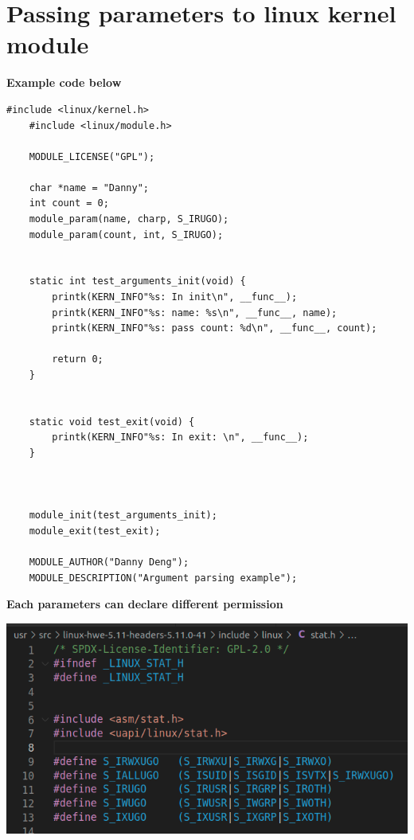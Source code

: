 \section{Passing parameters to linux kernel module}


\textbf{Example code below}
\begin{lstlisting}[style=CStyle]
    #include <linux/kernel.h>
    #include <linux/module.h>
    
    MODULE_LICENSE("GPL");
    
    char *name = "Danny";
    int count = 0;
    module_param(name, charp, S_IRUGO);
    module_param(count, int, S_IRUGO);
    
    
    static int test_arguments_init(void) {
        printk(KERN_INFO"%s: In init\n", __func__);
        printk(KERN_INFO"%s: name: %s\n", __func__, name);
        printk(KERN_INFO"%s: pass count: %d\n", __func__, count);
    
        return 0;
    }
    
    
    static void test_exit(void) {
        printk(KERN_INFO"%s: In exit: \n", __func__);
    }
    
    
    
    module_init(test_arguments_init);
    module_exit(test_exit);
    
    MODULE_AUTHOR("Danny Deng");
    MODULE_DESCRIPTION("Argument parsing example");    
\end{lstlisting}

\text{}

\textbf{Each parameters can declare different permission}
\begin{center}
    \includegraphics[width=\linewidth]{images/kernel_permission.png}
\end{center}

